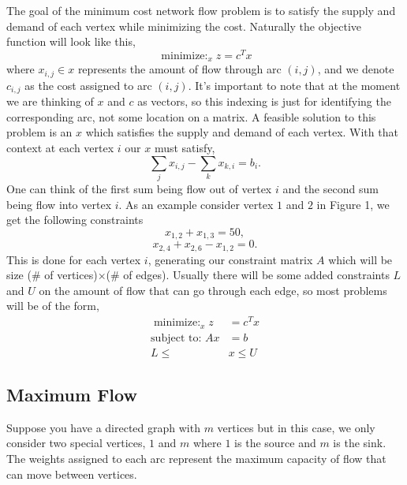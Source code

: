 \documentclass[12pt]{amsart}
\begin{document}
The goal of the minimum cost network flow problem is to satisfy the supply and demand of each vertex while minimizing the cost. Naturally the objective function will look 
like this, 
\begin{equation*}
    \mathop{\text{minimize: }}_{x}  z = c^Tx
\end{equation*}
where $x_{i,j} \in x$ represents the amount of flow through arc $(i, j)$, and we denote $c_{i, j}$ as the cost assigned to arc $(i, j)$. It's important to note that at the moment we are thinking of $x$ and $c$ as vectors, so this indexing is just for identifying 
the corresponding arc, not some location on a matrix. A feasible solution to this problem is an $x$ which satisfies the supply and demand of each vertex. 
With that context at each vertex $i$ our $x$ must satisfy, 
\begin{equation*}
  \sum_{j}x_{i, j} - \sum_{k}x_{k, i} = b_i.
\end{equation*} 
One can think of the first sum being flow out of vertex $i$ and the second sum being flow into vertex $i$. As an example consider vertex $1$ and $2$ in Figure 1, 
we get the following constraints
\begin{equation*}
  x_{1, 2} + x_{1,3} = 50,
\end{equation*}
\begin{equation*}
  x_{2, 4} + x_{2, 6} - x_{1, 2} = 0.
\end{equation*}
This is done for each vertex $i$, generating our constraint matrix $A$ which will be size (\# of vertices)$ \times $(\# of edges). Usually there will be some added constraints $L$ and $U$ on the amount of flow that can go through each edge, so most problems will be of the form, 
\begin{align*}
    \mathop{\text{minimize: }}_{x}  z &= c^Tx\\
  \text{subject to: }Ax &= b\\
  L \leq&x\leq U
\end{align*}



\subsection{Maximum Flow}
Suppose you have a directed graph with $m$ vertices but in this case, we only consider two special vertices, $1$ and $m$ where $1$ is 
the source and $m$ is the sink. The weights assigned to each arc represent the maximum capacity of flow that can move between vertices. \\
\end{document}

